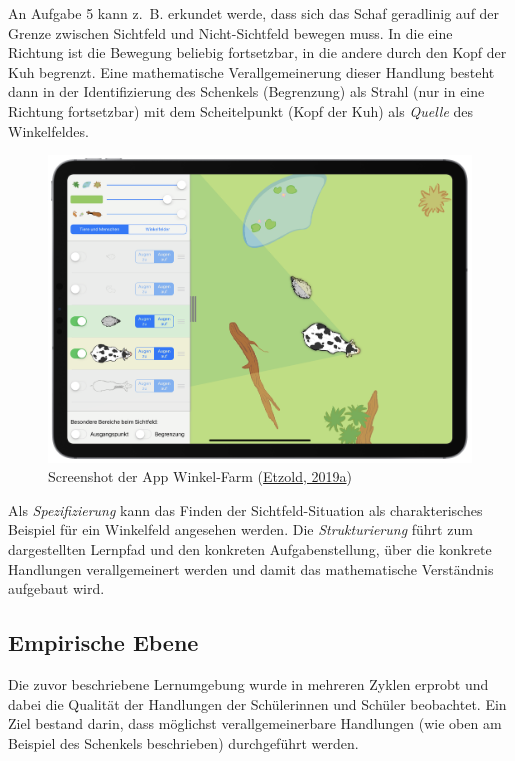 \documentclass[
  ngerman,
]{scrbook}
\theoremstyle{definition}
\theoremstyle{definition}
\theoremstyle{definition}
\theoremstyle{definition}
\theoremstyle{remark}
\begin{document}
An Aufgabe 5 kann z.~B. erkundet werde, dass sich das Schaf geradlinig auf der Grenze zwischen Sichtfeld und Nicht-Sichtfeld bewegen muss. In die eine Richtung ist die Bewegung beliebig fortsetzbar, in die andere durch den Kopf der Kuh begrenzt. Eine mathematische Verallgemeinerung dieser Handlung besteht dann in der Identifizierung des Schenkels (Begrenzung) als Strahl (nur in eine Richtung fortsetzbar) mit dem Scheitelpunkt (Kopf der Kuh) als \emph{Quelle} des Winkelfeldes.



\begin{figure}

{\centering \includegraphics[width=0.75\linewidth]{pictures/2-Winkelfarm} 

}

\caption{Screenshot der App Winkel-Farm (\protect\hyperlink{ref-Etzold:2019}{Etzold, 2019a})}\label{fig:WinkelfarmApp}
\end{figure}

Als \emph{Spezifizierung} kann das Finden der Sichtfeld-Situation als charakterisches Beispiel für ein Winkelfeld angesehen werden. Die \emph{Strukturierung} führt zum dargestellten Lernpfad und den konkreten Aufgabenstellung, über die konkrete Handlungen verallgemeinert werden und damit das mathematische Verständnis aufgebaut wird.

\hypertarget{empirische-ebene}{%
\subsection{Empirische Ebene}\label{empirische-ebene}}

Die zuvor beschriebene Lernumgebung wurde in mehreren Zyklen erprobt und dabei die Qualität der Handlungen der Schülerinnen und Schüler beobachtet. Ein Ziel bestand darin, dass möglichst verallgemeinerbare Handlungen (wie oben am Beispiel des Schenkels beschrieben) durchgeführt werden.
\end{document}
